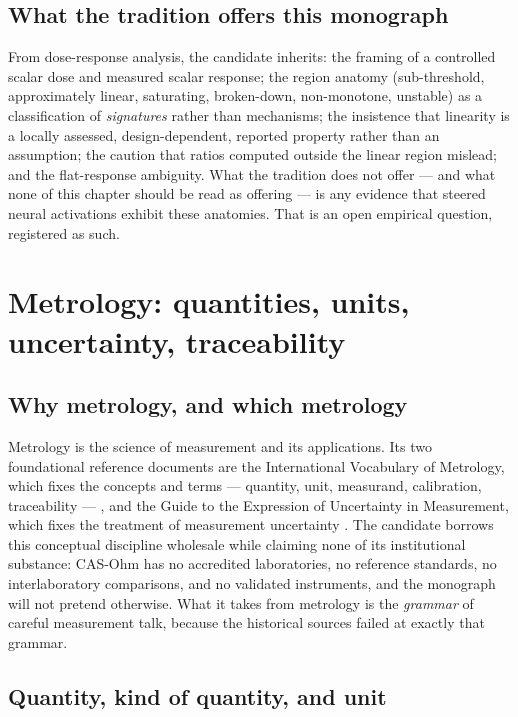 \subsection{What the tradition offers this monograph}\label{ch02:dose:offer}

From dose-response analysis, the candidate inherits: the framing of a controlled scalar dose and measured scalar response; the region anatomy (sub-threshold, approximately linear, saturating, broken-down, non-monotone, unstable) as a classification of \emph{signatures} rather than mechanisms; the insistence that linearity is a locally assessed, design-dependent, reported property rather than an assumption; the caution that ratios computed outside the linear region mislead; and the flat-response ambiguity. What the tradition does not offer --- and what none of this chapter should be read as offering --- is any evidence that steered neural activations exhibit these anatomies. That is an open empirical question, registered as such.

\section{Metrology: quantities, units, uncertainty, traceability}\label{ch02:metrology}

\subsection{Why metrology, and which metrology}\label{ch02:metrology:why}

Metrology is the science of measurement and its applications. Its two foundational reference documents are the International Vocabulary of Metrology, which fixes the concepts and terms --- quantity, unit, measurand, calibration, traceability --- \cite{vim}, and the Guide to the Expression of Uncertainty in Measurement, which fixes the treatment of measurement uncertainty \cite{gum}. The candidate borrows this conceptual discipline wholesale while claiming none of its institutional substance: CAS-Ohm has no accredited laboratories, no reference standards, no interlaboratory comparisons, and no validated instruments, and the monograph will not pretend otherwise. What it takes from metrology is the \emph{grammar} of careful measurement talk, because the historical sources failed at exactly that grammar.

\subsection{Quantity, kind of quantity, and unit}\label{ch02:metrology:quantity}

